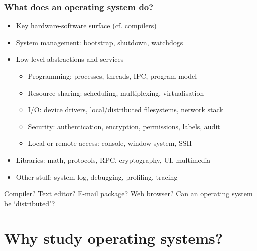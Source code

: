 \begin{frame}
  \frametitle{What does an operating system do?}

  \begin{itemize}
    \item Key hardware-software surface (cf. compilers)
    \item System management: bootstrap, shutdown, watchdogs
    \item Low-level abstractions and services
    \begin{itemize}
      \item Programming: processes, threads, IPC, program model
      \item Resource sharing: scheduling, multiplexing, virtualisation
      \item I/O: device drivers, local/distributed filesystems, network stack
      \item Security: authentication, encryption, permissions, labels, audit
      \item Local or remote access: console, window system, SSH
    \end{itemize}
    \item Libraries: math, protocols, RPC, cryptography, UI, multimedia
    \item Other stuff: system log, debugging, profiling, tracing
  \end{itemize}

  \pause
  \bigskip

  Compiler?  Text editor?  E-mail package?  Web browser?  Can an operating
  system be `distributed'?
\end{frame}

\section{Why study operating systems?}

